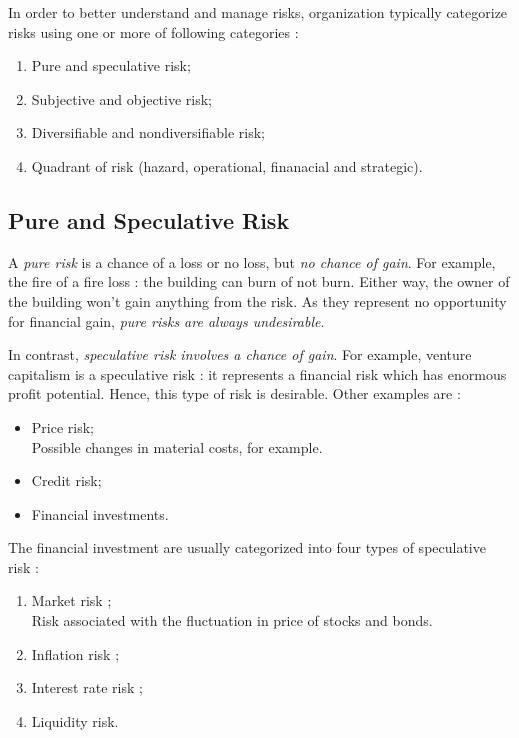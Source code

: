 \documentclass[11pt, english]{memoir}
\numberwithin{definition}{section}
\newenvironment{smalltext}
{\footnotesize }{\normalsize}
\begin{document}
In order to better understand and manage risks, organization typically categorize risks using one or more of following categories : 
\begin{enumerate}
	\item Pure and speculative risk; 
	\item Subjective and objective risk;
	\item Diversifiable and nondiversifiable risk;
	\item Quadrant of risk (hazard, operational, finanacial and strategic).
\end{enumerate}


\subsection{Pure and Speculative Risk}

A \emph{pure risk} is a chance of a loss or no loss, but \emph{no chance of gain}. For example, the fire of a fire loss : the building can burn of not burn. Either way, the owner of the building won't gain anything from the risk. As they represent no opportunity for financial gain, \emph{pure risks are always undesirable}. 

In contrast, \emph{speculative risk involves a chance of gain}. For example, venture capitalism is a speculative risk : it represents a financial risk which has enormous profit potential. Hence, this type of risk is desirable. Other examples are : 
\begin{itemize}
	\item Price risk;\\
	\begin{smalltext}
		Possible changes in material costs, for example.
	\end{smalltext} 
	\item Credit risk;
	\item Financial investments. 
\end{itemize}

The financial investment are usually categorized into four types of speculative risk : 
\begin{enumerate}
	\item Market risk ; \\
	\begin{smalltext}
		Risk associated with the fluctuation in price of stocks and bonds.
	\end{smalltext} 
	\item Inflation risk ;
	\item Interest rate risk ;
	\item Liquidity risk. 
\end{enumerate}
\end{document}

